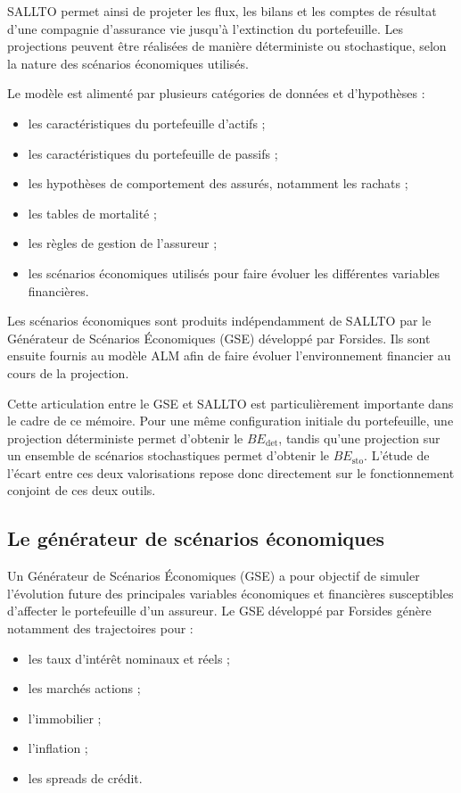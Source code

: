 SALLTO permet ainsi de projeter les flux, les bilans et les comptes de résultat d'une compagnie d'assurance vie jusqu'à l'extinction du portefeuille. Les projections peuvent être réalisées de manière déterministe ou stochastique, selon la nature des scénarios économiques utilisés.

Le modèle est alimenté par plusieurs catégories de données et d'hypothèses :
\begin{itemize}[noitemsep,topsep=2pt]
    \item les caractéristiques du portefeuille d'actifs ;
    \item les caractéristiques du portefeuille de passifs ;
    \item les hypothèses de comportement des assurés, notamment les rachats ;
    \item les tables de mortalité ;
    \item les règles de gestion de l'assureur ;
    \item les scénarios économiques utilisés pour faire évoluer les différentes variables financières.
\end{itemize}

Les scénarios économiques sont produits indépendamment de SALLTO par le Générateur de Scénarios Économiques (GSE) développé par Forsides. Ils sont ensuite fournis au modèle ALM afin de faire évoluer l'environnement financier au cours de la projection.

Cette articulation entre le GSE et SALLTO est particulièrement importante dans le cadre de ce mémoire. Pour une même configuration initiale du portefeuille, une projection déterministe permet d'obtenir le $BE_{\mathrm{det}}$, tandis qu'une projection sur un ensemble de scénarios stochastiques permet d'obtenir le $BE_{\mathrm{sto}}$. L'étude de l'écart entre ces deux valorisations repose donc directement sur le fonctionnement conjoint de ces deux outils.


\subsection{Le générateur de scénarios économiques}

Un Générateur de Scénarios Économiques (GSE) a pour objectif de simuler l'évolution future des principales variables économiques et financières susceptibles d'affecter le portefeuille d'un assureur. Le GSE développé par Forsides génère notamment des trajectoires pour :
\begin{itemize}[noitemsep,topsep=2pt]
    \item les taux d'intérêt nominaux et réels ;
    \item les marchés actions ;
    \item l'immobilier ;
    \item l'inflation ;
    \item les spreads de crédit.
\end{itemize}

